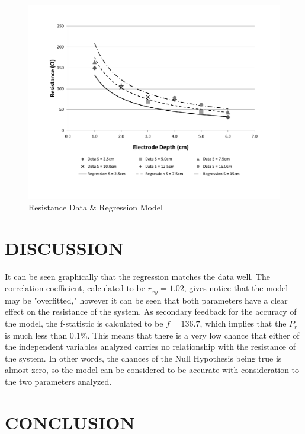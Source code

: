 \documentclass[12pt]{article}
\begin{document}
\begin{figure}[t!] %
   \centering
   \includegraphics[width=\linewidth]{data_and_regression.pdf} 
   \caption{Resistance Data \& Regression Model}
   \label{fig:example}
\end{figure}

\section*{\fontsize{12}{12}\selectfont DISCUSSION}
It can be seen graphically that the regression matches the data well. The correlation coefficient, calculated to be $r_{xy}=1.02$, gives notice that the model may be "overfitted," however it can be seen that both parameters have a clear effect on the resistance of the system. As secondary feedback for the accuracy of the model, the f-statistic is calculated to be $f=136.7$, which implies that the $P_r$ is much less than 0.1\%. This means that there is a very low chance that either of the independent variables analyzed carries no relationship with the resistance of the system. In other words, the chances of the Null Hypothesis being true is almost zero, so the model can be considered to be accurate with consideration to the two parameters analyzed.

\section*{\fontsize{12}{12}\selectfont CONCLUSION}
\end{document}
